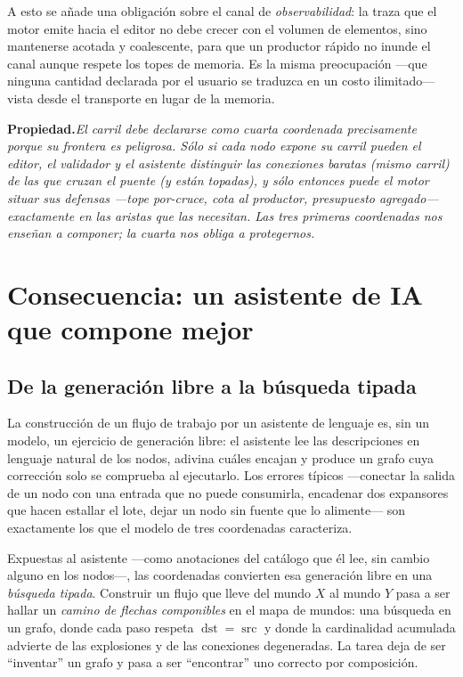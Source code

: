 \documentclass[11pt,a4paper]{article}
\theoremstyle{definition}
\theoremstyle{plain}
\newcommand{\prop}[1]{\medskip\noindent\textbf{Propiedad.}\enspace\emph{#1}\medskip}
\begin{document}
A esto se añade una obligación sobre el canal de \emph{observabilidad}: la traza que
el motor emite hacia el editor no debe crecer con el volumen de elementos, sino
mantenerse acotada y coalescente, para que un productor rápido no inunde el canal
aunque respete los topes de memoria. Es la misma preocupación ---que ninguna cantidad
declarada por el usuario se traduzca en un costo ilimitado--- vista desde el
transporte en lugar de la memoria.

\prop{El carril debe declararse como cuarta coordenada precisamente porque su
frontera es peligrosa. Sólo si cada nodo expone su carril pueden el editor, el
validador y el asistente distinguir las conexiones baratas (mismo carril) de las que
cruzan el puente (y están topadas), y sólo entonces puede el motor situar sus
defensas ---tope por-cruce, cota al productor, presupuesto agregado--- exactamente en
las aristas que las necesitan. Las tres primeras coordenadas nos enseñan a componer;
la cuarta nos obliga a protegernos.}

\section{Consecuencia: un asistente de IA que compone mejor}

\subsection{De la generación libre a la búsqueda tipada}

La construcción de un flujo de trabajo por un asistente de lenguaje es, sin un
modelo, un ejercicio de generación libre: el asistente lee las descripciones en
lenguaje natural de los nodos, adivina cuáles encajan y produce un grafo cuya
corrección solo se comprueba al ejecutarlo. Los errores típicos ---conectar la
salida de un nodo con una entrada que no puede consumirla, encadenar dos expansores
que hacen estallar el lote, dejar un nodo sin fuente que lo alimente--- son
exactamente los que el modelo de tres coordenadas caracteriza.

Expuestas al asistente ---como anotaciones del catálogo que él lee, sin cambio alguno
en los nodos---, las coordenadas convierten esa generación libre en una
\emph{búsqueda tipada}. Construir un flujo que lleve del mundo $X$ al mundo $Y$ pasa
a ser hallar un \emph{camino de flechas componibles} en el mapa de mundos: una
búsqueda en un grafo, donde cada paso respeta $\operatorname{dst}=\operatorname{src}$
y donde la cardinalidad acumulada advierte de las explosiones y de las conexiones
degeneradas. La tarea deja de ser ``inventar'' un grafo y pasa a ser ``encontrar''
uno correcto por composición.
\end{document}
